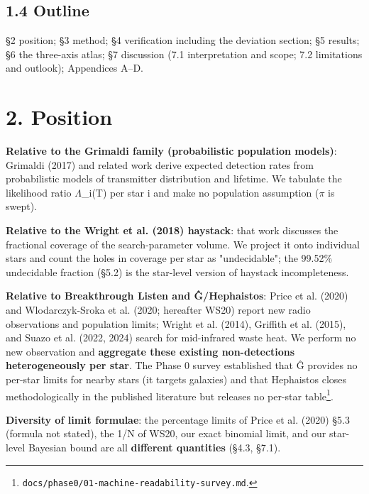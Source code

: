 \documentclass[11pt]{article}
\begin{document}
\subsection*{1.4 Outline}
\noindent \S{}2 position; \S{}3 method; \S{}4 verification including the deviation section; \S{}5 results; \S{}6 the three-axis atlas; \S{}7 discussion (7.1 interpretation and scope; 7.2 limitations and outlook); Appendices A--D.\par\smallskip

\section*{2. Position}

\noindent \textbf{Relative to the Grimaldi family (probabilistic population models)}: Grimaldi (2017) and related work derive expected detection rates from probabilistic models of transmitter distribution and lifetime. We tabulate the likelihood ratio \(\Lambda\)\_i(T) per star i and make no population assumption (\(\pi\) is swept).\par\smallskip
\noindent \textbf{Relative to the Wright et al. (2018) haystack}: that work discusses the fractional coverage of the search-parameter volume. We project it onto individual stars and count the holes in coverage per star as "undecidable"; the 99.52\% undecidable fraction (\S{}5.2) is the star-level version of haystack incompleteness.\par\smallskip
\noindent \textbf{Relative to Breakthrough Listen and \^{G}/Hephaistos}: Price et al. (2020) and Wlodarczyk-Sroka et al. (2020; hereafter WS20) report new radio observations and population limits; Wright et al. (2014), Griffith et al. (2015), and Suazo et al. (2022, 2024) search for mid-infrared waste heat. We perform no new observation and \textbf{aggregate these existing non-detections heterogeneously per star}. The Phase 0 survey established that \^{G} provides no per-star limits for nearby stars (it targets galaxies) and that Hephaistos closes methodologically in the published literature but releases no per-star table\footnote{\texttt{docs/phase0/01-machine-readability-survey.md}.}.\par\smallskip
\noindent \textbf{Diversity of limit formulae}: the percentage limits of Price et al. (2020) \S{}5.3 (formula not stated), the 1/N of WS20, our exact binomial limit, and our star-level Bayesian bound are all \textbf{different quantities} (\S{}4.3, \S{}7.1).\par\smallskip
\end{document}
